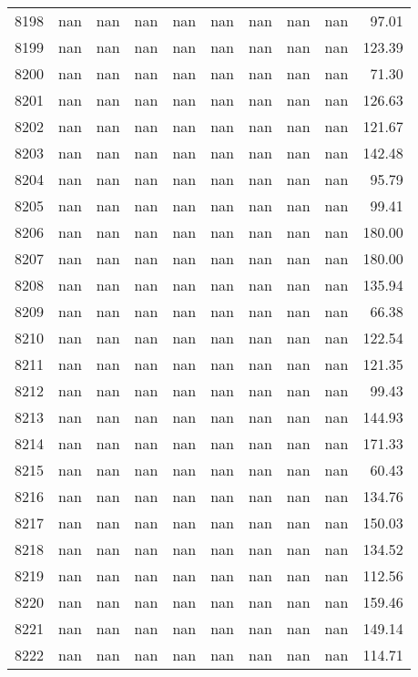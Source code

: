 \begin{tabular}{lrrrrrrrrr}
8198 & nan & nan & nan & nan & nan & nan & nan & nan & 97.01 \\
8199 & nan & nan & nan & nan & nan & nan & nan & nan & 123.39 \\
8200 & nan & nan & nan & nan & nan & nan & nan & nan & 71.30 \\
8201 & nan & nan & nan & nan & nan & nan & nan & nan & 126.63 \\
8202 & nan & nan & nan & nan & nan & nan & nan & nan & 121.67 \\
8203 & nan & nan & nan & nan & nan & nan & nan & nan & 142.48 \\
8204 & nan & nan & nan & nan & nan & nan & nan & nan & 95.79 \\
8205 & nan & nan & nan & nan & nan & nan & nan & nan & 99.41 \\
8206 & nan & nan & nan & nan & nan & nan & nan & nan & 180.00 \\
8207 & nan & nan & nan & nan & nan & nan & nan & nan & 180.00 \\
8208 & nan & nan & nan & nan & nan & nan & nan & nan & 135.94 \\
8209 & nan & nan & nan & nan & nan & nan & nan & nan & 66.38 \\
8210 & nan & nan & nan & nan & nan & nan & nan & nan & 122.54 \\
8211 & nan & nan & nan & nan & nan & nan & nan & nan & 121.35 \\
8212 & nan & nan & nan & nan & nan & nan & nan & nan & 99.43 \\
8213 & nan & nan & nan & nan & nan & nan & nan & nan & 144.93 \\
8214 & nan & nan & nan & nan & nan & nan & nan & nan & 171.33 \\
8215 & nan & nan & nan & nan & nan & nan & nan & nan & 60.43 \\
8216 & nan & nan & nan & nan & nan & nan & nan & nan & 134.76 \\
8217 & nan & nan & nan & nan & nan & nan & nan & nan & 150.03 \\
8218 & nan & nan & nan & nan & nan & nan & nan & nan & 134.52 \\
8219 & nan & nan & nan & nan & nan & nan & nan & nan & 112.56 \\
8220 & nan & nan & nan & nan & nan & nan & nan & nan & 159.46 \\
8221 & nan & nan & nan & nan & nan & nan & nan & nan & 149.14 \\
8222 & nan & nan & nan & nan & nan & nan & nan & nan & 114.71 \\

\end{tabular}
